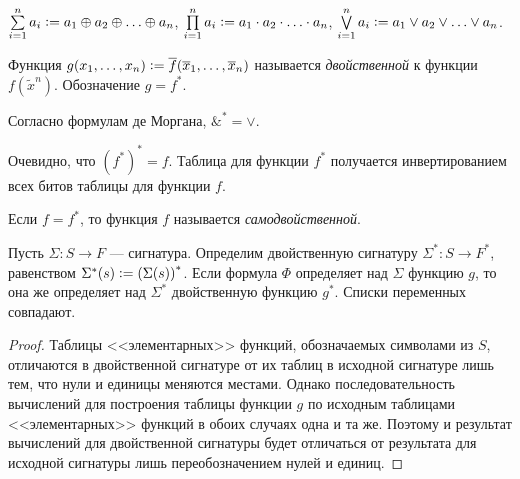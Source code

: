 \begin{definition}
    $\sum\limits_{i = 1}^na_i \vcentcolon = a_1 \oplus a_2 \oplus \ldots \oplus a_n$, $\prod\limits_{i = 1}^na_i \vcentcolon = a_1 \cdot a_2 \cdot \ldots \cdot a_n$, $\bigvee\limits_{i = 1}^na_i \vcentcolon = a_1 \vee a_2 \vee \ldots \vee a_n$.
\end{definition}

\begin{definition}
    Функция $g(x_1, \ldots, x_n) \vcentcolon = \overline{f}(\overline{x}_1, \ldots, \overline{x}_n)$ называется \textit{двойственной} к функции $f(\widetilde{x}^n)$. Обозначение $g = f^\ast$.
\end{definition}

\begin{remark}
    Согласно формулам де Моргана, $\&^\ast = \vee$.
\end{remark}

\begin{remark}
    Очевидно, что $(f^\ast)^\ast = f$. Таблица для функции $f^\ast$ получается инвертированием всех битов таблицы для функции $f$.
\end{remark}

\begin{definition}
    Если $f = f^\ast$, то функция $f$ называется \textit{самодвойственной}.
\end{definition}

\begin{theorem}
    Пусть $\Sigma: S \to F$ --- сигнатура. Определим двойственную сигнатуру $\Sigma^\ast: S \to F^\ast$, равенством $\Sigma^\ast(s) \vcentcolon = \left(\Sigma(s)\right)^\ast$. Если формула $\Phi$ определяет над $\Sigma$ функцию $g$, то она же определяет над $\Sigma^\ast$ двойственную функцию $g^\ast$. Списки переменных совпадают.
\end{theorem}

\begin{proof}
    Таблицы <<элементарных>> функций, обозначаемых символами из $S$, отличаются в двойственной сигнатуре от их таблиц в исходной сигнатуре лишь тем, что нули и единицы меняются местами. Однако последовательность вычислений для построения таблицы функции $g$ по исходным таблицами <<элементарных>> функций в обоих случаях одна и та же. Поэтому и результат вычислений для двойственной сигнатуры будет отличаться от результата для исходной сигнатуры лишь переобозначением нулей и единиц.
\end{proof}

